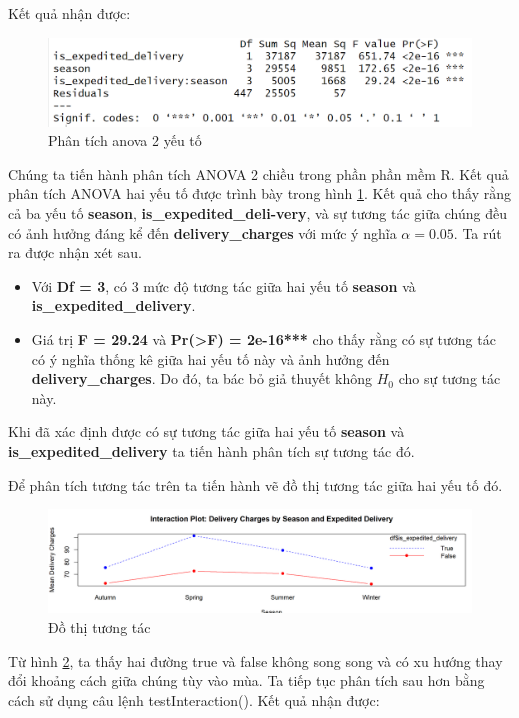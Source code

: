 Kết quả nhận được: 
\begin{figure}[!htbp]
    \centering
    \includegraphics[width=1\linewidth]{graphics/5.4.4.png}
    \caption{Phân tích anova 2 yếu tố}
    \label{fig:5.6}
\end{figure}

Chúng ta tiến hành phân tích ANOVA 2 chiều trong phần phần mềm R. Kết quả phân tích ANOVA hai yếu tố được trình bày trong hình \ref{fig:5.6}. Kết quả cho thấy rằng cả ba yếu tố \textbf{season}, \textbf{is\_expedited\_deli-very}, và sự tương tác giữa chúng đều có ảnh hưởng đáng kể đến \textbf{delivery\_charges} với mức ý nghĩa $\alpha = 0.05$. Ta rút ra được nhận xét sau.
\begin{itemize}
    \item Với \textbf{Df = 3}, có 3 mức độ tương tác giữa hai yếu tố \textbf{season} và \textbf{is\_expedited\_delivery}.
    \item Giá trị \textbf{F = 29.24} và \textbf{Pr(>F) = 2e-16***} cho thấy rằng có sự tương tác có ý nghĩa thống kê giữa hai yếu tố này và ảnh hưởng đến \textbf{delivery\_charges}. Do đó, ta bác bỏ giả thuyết không \(H_0\) cho sự tương tác này.
\end{itemize}
 Khi đã xác định được có sự tương tác giữa hai yếu tố \textbf{season} và \textbf{is\_expedited\_delivery} ta tiến hành phân tích sự tương tác đó. 

Để phân tích tương tác trên ta tiến hành vẽ đồ thị tương tác giữa hai yếu tố đó.

\begin{figure}[!htbp]
    \centering
    \includegraphics[width=0.7\linewidth]{graphics/5.7.png}
    \caption{Đồ thị tương tác}
    \label{fig:5.7}
\end{figure}

Từ hình \ref{fig:5.7}, ta thấy hai đường true và false không song song và có xu hướng thay đổi khoảng cách giữa chúng tùy vào mùa.
Ta tiếp tục phân tích sau hơn bằng cách sử dụng câu lệnh testInteraction().
Kết quả nhận được:

